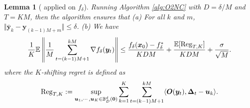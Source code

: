 \documentclass{article}
\def\vzero{{\bm{0}}}
\def\vu{{\bm{u}}}
\def\vv{{\bm{v}}}
\def\vx{{\bm{x}}}
\def\vy{{\bm{y}}}
\def\mO{{\bm{O}}}
\def\sB{{\mathbb{B}}}
\newcommand{\E}{\mathbb{E}}
\def\vDelta{{\bm{\Delta}}}
\newtheorem{lem}{Lemma}[section]
\theoremstyle{definition}
\theoremstyle{remark}
\begin{document}
	\begin{lem}[{\citep[Theorem 8]{cutkosky2023optimal} applied on $f_{\delta}$}] \label{lem:O2NC}
		Running 
		Algorithm \ref{alg:O2NC} with $D = \delta/M$ and $T = KM$, then the algorithm ensures that (a) For all $k$ and $m$,  $\Vert \bar \vy_k - \vy_{(k-1)M+m} \Vert \le \delta$. (b) We have
		\begin{align} \label{eq:regret-sta}
			\frac{1}{K} \E \left \Vert \frac{1}{M} \sum_{t=(k-1)M+1}^{kM} \nabla f_{\delta}(\vy_t) \right \Vert \le \frac{f_\delta(\vx_0) - f_\delta^*}{K DM} + \frac{\E[{\rm Reg}_{T,K}]}{KDM} + \frac{\sigma}{\sqrt{M}}. %
		\end{align}
		where the $K$-shifting regret is defined as
		\begin{align} \label{eq:dyn-regret}
			{\rm Reg}_{T,K}:= \sup_{\vu_1,\cdots,\vu_K \in \sB_D^d(\vzero)} \sum_{k=1}^K \sum_{t= (k-1)M +1}^{k M} \langle \mO(\vy_t), \vDelta_t - \vu_k \rangle.  
		\end{align}
	\end{lem}
	
\end{document}
